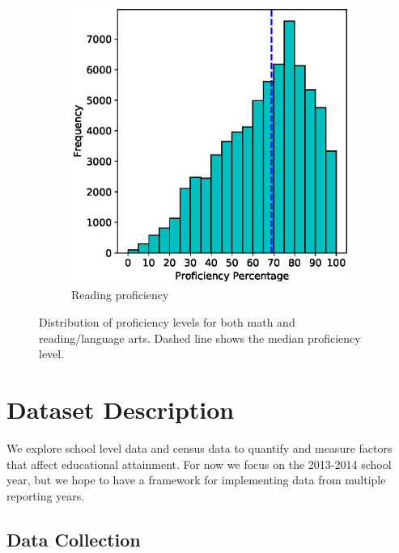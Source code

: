 \begin{figure}
\begin{subfigure}{.2325\textwidth}
		\includegraphics[width=\linewidth]{images/prof_read}
		\caption{Reading proficiency}
	\end{subfigure}
	\caption{Distribution of proficiency levels for both math and reading/language arts. Dashed line shows the median proficiency level.}
	\label{fig:prof}
\end{figure}

\section{Dataset Description} \label{sec:data}

We explore school level data and census data to quantify and measure factors that affect educational attainment. For now we focus on the 2013-2014 school year, but we hope to have a framework for implementing data from multiple reporting years.

\subsection{Data Collection} \label{sec:collect}

